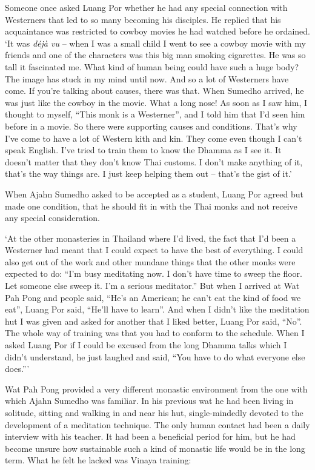 Someone once asked Luang Por whether he had any special connection with
Westerners that led to so many becoming his disciples. He replied that
his acquaintance was restricted to cowboy movies he had watched before
he ordained. `It was \emph{déjà vu} -- when I was a small child I went
to see a cowboy movie with my friends and one of the characters was this
big man smoking cigarettes. He was so tall it fascinated me. What kind
of human being could have such a huge body? The image has stuck in my
mind until now. And so a lot of Westerners have come. If you're talking
about causes, there was that. When Sumedho arrived, he was just like the
cowboy in the movie. What a long nose! As soon as I saw him, I thought
to myself, ``This monk is a Westerner'', and I told him that I'd seen
him before in a movie. So there were supporting causes and conditions. 
That's why I've come to have a lot of Western kith and kin. They come
even though I can't speak English. I've tried to train them to know the
Dhamma as I see it. It doesn't matter that they don't know Thai customs. 
I don't make anything of it, that's the way things are. I just keep
helping them out -- that's the gist of it.'

When Ajahn Sumedho asked to be accepted as a student, Luang Por agreed
but made one condition, that he should fit in with the Thai monks and
not receive any special consideration. 

`At the other monasteries in Thailand where I'd lived, the fact that I'd
been a Westerner had meant that I could expect to have the best of
everything. I could also get out of the work and other mundane things
that the other monks were expected to do: ``I'm busy meditating now. I
don't have time to sweep the floor. Let someone else sweep it. I'm a
serious meditator.'' But when I arrived at Wat Pah Pong and people said,
``He's an American; he can't eat the kind of food we eat'', Luang Por
said, ``He'll have to learn''. And when I didn't like the meditation hut
I was given and asked for another that I liked better, Luang Por said,
``No''. The whole way of training was that you had to conform to the
schedule. When I asked Luang Por if I could be excused from the long
Dhamma talks which I didn't understand, he just laughed and said, ``You
have to do what everyone else does.''\thinspace'

Wat Pah Pong provided a very different monastic environment from the one
with which Ajahn Sumedho was familiar. In his previous wat he had been
living in solitude, sitting and walking in and near his hut, 
single-mindedly devoted to the development of a meditation technique. 
The only human contact had been a daily interview with his teacher. It
had been a beneficial period for him, but he had become unsure how
sustainable such a kind of monastic life would be in the long term. What
he felt he lacked was Vinaya training: 

